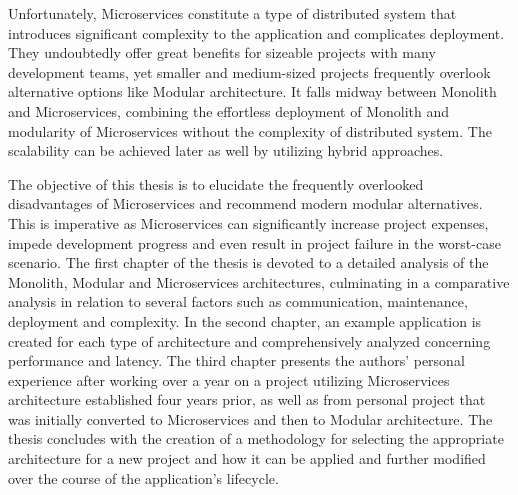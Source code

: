 Unfortunately, Microservices constitute a type of distributed system that introduces significant complexity to the application and complicates deployment. They undoubtedly offer great benefits for sizeable projects with many development teams, yet smaller and medium-sized projects frequently overlook alternative options like Modular architecture. It falls midway between Monolith and Microservices, combining the effortless deployment of Monolith and modularity of Microservices without the complexity of distributed system. The scalability can be achieved later as well by utilizing hybrid approaches.

The objective of this thesis is to elucidate the frequently overlooked disadvantages of Microservices and recommend modern modular alternatives. This is imperative as Microservices can significantly increase project expenses, impede development progress and even result in project failure in the worst-case scenario. The first chapter of the thesis is devoted to a detailed analysis of the Monolith, Modular and Microservices architectures, culminating in a comparative analysis in relation to several factors such as communication, maintenance, deployment and complexity. In the second chapter, an example application is created for each type of architecture and comprehensively analyzed concerning performance and latency. The third chapter presents the authors' personal experience after working over a year on a project utilizing Microservices architecture established four years prior, as well as from personal project that was initially converted to Microservices and then to Modular architecture. The thesis concludes with the creation of a methodology for selecting the appropriate architecture for a new project and how it can be applied and further modified over the course of the application's lifecycle.






